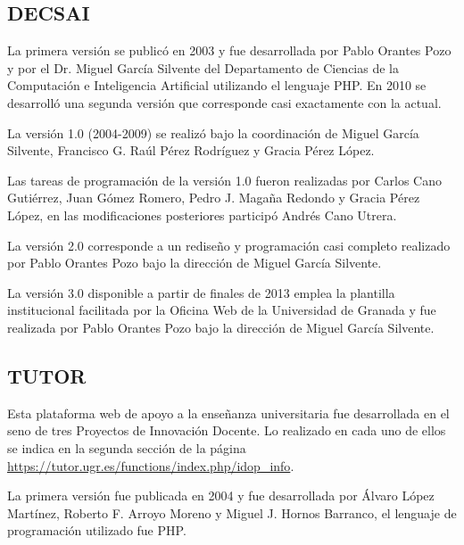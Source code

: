 \subsection{DECSAI}

La primera versión se publicó en 2003 y fue desarrollada por Pablo Orantes Pozo y por el Dr. Miguel García Silvente del Departamento de Ciencias de la Computación e Inteligencia Artificial utilizando el lenguaje PHP. En 2010 se desarrolló una segunda versión que corresponde casi exactamente con la actual.

\bigskip
La versión 1.0 (2004-2009) se realizó bajo la coordinación de Miguel García Silvente, Francisco G. Raúl Pérez Rodríguez y Gracia Pérez López.

\bigskip
Las tareas de programación de la versión 1.0 fueron realizadas por Carlos Cano Gutiérrez, Juan Gómez Romero, Pedro J. Magaña Redondo y Gracia Pérez López, en las modificaciones posteriores participó Andrés Cano Utrera.

\bigskip
La versión 2.0 corresponde a un rediseño y programación casi completo realizado por Pablo Orantes Pozo bajo la dirección de Miguel García Silvente.


\bigskip
La versión 3.0 disponible a partir de finales de 2013 emplea la plantilla institucional facilitada por la Oficina Web de la Universidad de Granada y fue realizada por Pablo Orantes Pozo bajo la dirección de Miguel García Silvente.


\subsection{TUTOR}
Esta plataforma web de apoyo a la enseñanza universitaria fue desarrollada en el seno de tres Proyectos de Innovación Docente. Lo realizado en cada uno de ellos se indica en la segunda sección de la página \url{https://tutor.ugr.es/functions/index.php/idop_info}.

\bigskip
La primera versión fue publicada en 2004 y fue desarrollada por Álvaro López Martínez, Roberto F. Arroyo Moreno y Miguel J. Hornos Barranco, el lenguaje de programación utilizado fue PHP.
